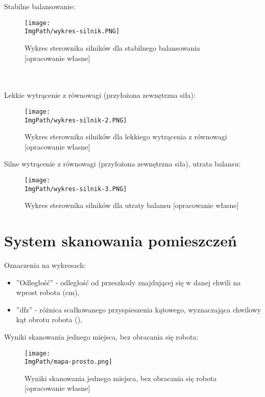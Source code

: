 \documentclass[a4paper,12pt,twoside,openany]{report}
\newcommand{\ImgPath}{.}
\begin{document}
\newpage
\noindent Stabilne balansowanie:
\begin{figure}[!htbp]
	\begin{center}
\centering
\texttt{[image: \\ImgPath/wykres-silnik.PNG]}
\end{center}
	\caption{Wykres sterownika silników dla stabilnego balansowania [opracowanie własne]}
	\label{schematKomunikacji}
\end{figure}
\\
\\
\noindent Lekkie wytrącenie z równowagi (przyłożona zewnętrzna siła):
\begin{figure}[!htbp]
	\begin{center}
\centering
\texttt{[image: \\ImgPath/wykres-silnik-2.PNG]}
\end{center}
	\caption{Wykres sterownika silników dla lekkiego wytrącenia z równowagi [opracowanie własne]}
	\label{schematKomunikacji}
\end{figure}

\newpage
\noindent Silne wytrącenie z równowagi (przyłożona zewnętrzna siła), utrata balansu:
\begin{figure}[!htbp]
	\begin{center}
\centering
\texttt{[image: \\ImgPath/wykres-silnik-3.PNG]}
\end{center}
	\caption{Wykres sterownika silników dla utraty balansu [opracowanie własne]}
	\label{schematKomunikacji}
\end{figure}

\section{System skanowania pomieszczeń}

\noindent Oznaczenia na wykresach:
\begin{itemize}
\item ''Odległość'' - odległość od przeszkody znajdującej się w danej chwili na wprost robota (cm),
\item ''dfz'' - różnica scałkowanego przyspieszenia kątowego, wyznaczająca chwilowy kąt obrotu robota (\textdegree),
\end{itemize}

\newpage
\noindent Wyniki skanowania jednego miejsca, bez obracania się robota:
\begin{figure}[!htbp]
	\begin{center}
\centering
\texttt{[image: \\ImgPath/mapa-prosto.png]}
\end{center}
	\caption{Wyniki skanowania jednego miejsca, bez obracania się robota [opracowanie własne]}
	\label{schematKomunikacji}
\end{figure}
\end{document}
